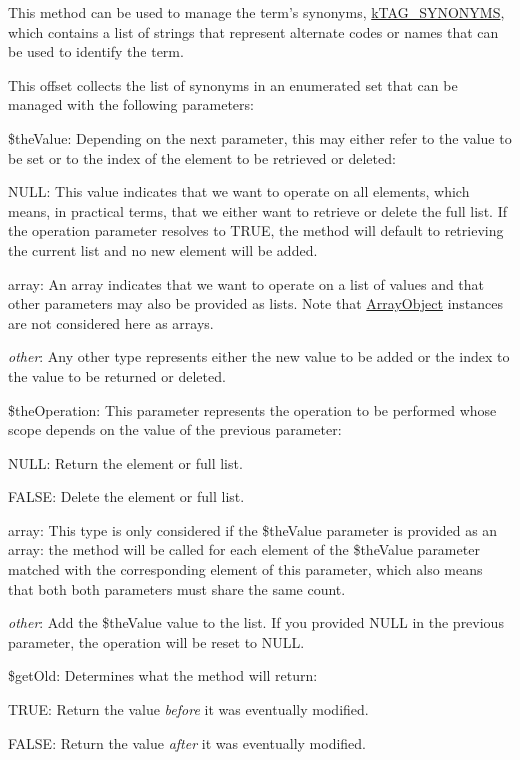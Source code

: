 This method can be used to manage the term's synonyms, \hyperlink{}{k\-T\-A\-G\-\_\-\-S\-Y\-N\-O\-N\-Y\-M\-S}, which contains a list of strings that represent alternate codes or names that can be used to identify the term.

This offset collects the list of synonyms in an enumerated set that can be managed with the following parameters\-:


\begin{DoxyItemize}
\item {\ttfamily \$the\-Value}\-: Depending on the next parameter, this may either refer to the value to be set or to the index of the element to be retrieved or deleted\-: 
\begin{DoxyItemize}
\item {\ttfamily N\-U\-L\-L}\-: This value indicates that we want to operate on all elements, which means, in practical terms, that we either want to retrieve or delete the full list. If the operation parameter resolves to {\ttfamily T\-R\-U\-E}, the method will default to retrieving the current list and no new element will be added. 
\item {\ttfamily array}\-: An array indicates that we want to operate on a list of values and that other parameters may also be provided as lists. Note that \hyperlink{}{Array\-Object} instances are not considered here as arrays. 
\item {\itshape other}\-: Any other type represents either the new value to be added or the index to the value to be returned or deleted. 
\end{DoxyItemize}
\item {\ttfamily \$the\-Operation}\-: This parameter represents the operation to be performed whose scope depends on the value of the previous parameter\-: 
\begin{DoxyItemize}
\item {\ttfamily N\-U\-L\-L}\-: Return the element or full list. 
\item {\ttfamily F\-A\-L\-S\-E}\-: Delete the element or full list. 
\item {\ttfamily array}\-: This type is only considered if the {\ttfamily \$the\-Value} parameter is provided as an array\-: the method will be called for each element of the {\ttfamily \$the\-Value} parameter matched with the corresponding element of this parameter, which also means that both both parameters must share the same count. 
\item {\itshape other}\-: Add the {\ttfamily \$the\-Value} value to the list. If you provided {\ttfamily N\-U\-L\-L} in the previous parameter, the operation will be reset to {\ttfamily N\-U\-L\-L}. 
\end{DoxyItemize}
\item {\ttfamily \$get\-Old}\-: Determines what the method will return\-: 
\begin{DoxyItemize}
\item {\ttfamily T\-R\-U\-E}\-: Return the value {\itshape before} it was eventually modified. 
\item {\ttfamily F\-A\-L\-S\-E}\-: Return the value {\itshape after} it was eventually modified. 
\end{DoxyItemize}
\end{DoxyItemize}


